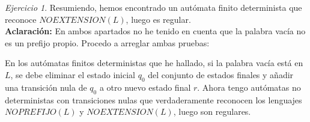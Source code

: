 \documentclass[12pt,spanish]{article}
\theoremstyle{definition}
\theoremstyle{remark}
\newtheorem{exercise}{Ejercicio}%
\begin{document}
\begin{exercise}
  Resumiendo, hemos encontrado un autómata finito determinista que
  reconoce $NOEXTENSION(L)$, luego es regular. \\

  \textbf{Aclaración:} En ambos apartados no he tenido en cuenta que
  la palabra vacía no es un prefijo propio. Procedo a arreglar ambas
  pruebas:

  En los autómatas finitos deterministas que he hallado, si la palabra
  vacía está en $L$, se debe eliminar el estado inicial $q_0$ del
  conjunto de estados finales y añadir una transición nula de $q_0$ a
  otro nuevo estado final $r$. Ahora tengo autómatas no deterministas
  con transiciones nulas que verdaderamente reconocen los lenguajes
  $NOPREFIJO(L)$ y $NOEXTENSION(L)$, luego son regulares.
\end{exercise}

\newpage
\end{document}
